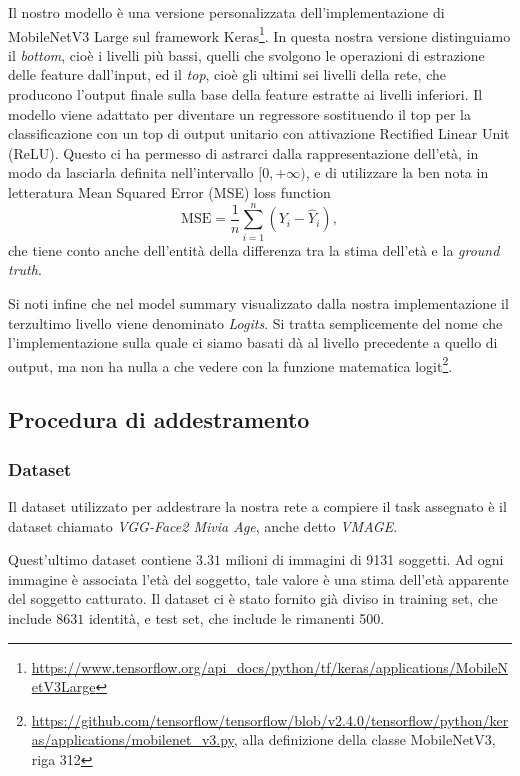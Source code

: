 Il nostro modello è una versione personalizzata dell'implementazione di MobileNetV3 Large sul framework Keras\footnote{\url{https://www.tensorflow.org/api_docs/python/tf/keras/applications/MobileNetV3Large}}. In questa nostra versione distinguiamo il \emph{bottom}, cioè i livelli più bassi, quelli che svolgono le operazioni di estrazione delle feature dall'input, ed il \emph{top}, cioè gli ultimi sei livelli della rete, che producono l'output finale sulla base della feature estratte ai livelli inferiori. Il modello viene adattato per diventare un regressore sostituendo il top per la classificazione con un top di output unitario con attivazione Rectified Linear Unit (ReLU). Questo ci ha permesso di astrarci dalla rappresentazione dell'età, in modo da lasciarla definita nell'intervallo \([0, +\infty)\), e di utilizzare la ben nota in letteratura Mean Squared Error (MSE) loss function
\begin{displaymath}
\text{MSE} = \frac{1}{n} \sum_{i=1}^{n} \left(Y_i - \hat{Y}_i\right),
\end{displaymath}
che tiene conto anche dell'entità della differenza tra la stima dell'età e la \emph{ground truth}.

Si noti infine che nel model summary visualizzato dalla nostra implementazione il terzultimo livello viene denominato \emph{Logits}. Si tratta semplicemente del nome che l'implementazione sulla quale ci siamo basati dà al livello precedente a quello di output, ma non ha nulla a che vedere con la funzione matematica logit\footnote{\url{https://github.com/tensorflow/tensorflow/blob/v2.4.0/tensorflow/python/keras/applications/mobilenet_v3.py}, alla definizione della classe MobileNetV3, riga 312}.

\subsection{Procedura di addestramento}
\subsubsection{Dataset}
\label{subsubsec:dataset}

Il dataset utilizzato per addestrare la nostra rete a compiere il task assegnato è il dataset chiamato \emph{VGG-Face2 Mivia Age}, anche detto \emph{VMAGE}\cite{miviaage}.

Quest'ultimo dataset contiene $3.31$ milioni di immagini di 9131 soggetti. Ad ogni immagine è associata l'età del soggetto, tale valore è una stima dell'età apparente del soggetto catturato.
Il dataset ci è stato fornito già diviso in training set, che include $8631$ identità, e test set, che include le rimanenti 500.

